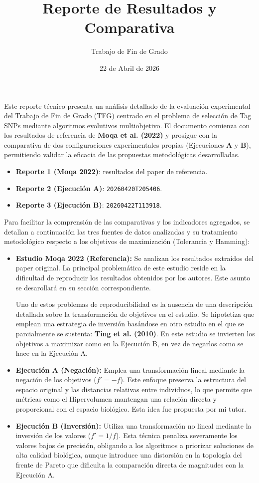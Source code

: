 \documentclass[a4paper,10pt]{article}
\title{Reporte de Resultados y Comparativa}
\author{Trabajo de Fin de Grado}
\date{22 de Abril de 2026}
\begin{document}
\maketitle

Este reporte técnico presenta un análisis detallado de la evaluación experimental del Trabajo de Fin de Grado (TFG) centrado en el problema de selección de Tag SNPs mediante algoritmos evolutivos multiobjetivo. El documento comienza con los resultados de referencia de \textbf{Moqa et al. (2022)} y prosigue con la comparativa de dos configuraciones experimentales propias (Ejecuciones \textbf{A} y \textbf{B}), permitiendo validar la eficacia de las propuestas metodológicas desarrolladas.

\begin{itemize}
    \item \textbf{Reporte 1 (Moqa 2022)}: resultados del paper de referencia.
    \item \textbf{Reporte 2 (Ejecución A)}: \texttt{20260420T205406}.
    \item \textbf{Reporte 3 (Ejecución B)}: \texttt{20260422T113918}.
\end{itemize}

Para facilitar la comprensión de las comparativas y los indicadores agregados, se detallan a continuación las tres fuentes de datos analizadas y su tratamiento metodológico respecto a los objetivos de maximización (Tolerancia y Hamming):

\begin{itemize}
    \item \textbf{Estudio Moqa 2022 (Referencia):} Se analizan los resultados extraídos del paper original. La principal problemática de este estudio reside en la dificultad de reproducir los resultados obtenidos por los autores. Este asunto se desarollará en su sección correspondiente. 
    
    Uno de estos problemas de reproducibilidad es la ausencia de una descripción detallada sobre la transformación de objetivos en el estudio. Se hipotetiza que emplean una estrategia de inversión basándose en otro estudio en el que se parcialmente se sustenta: \textbf{Ting et al. (2010)}. En este estudio se invierten los objetivos a maximizar como en la Ejecución B, en vez de negarlos como se hace en la Ejecución A.
    \item \textbf{Ejecución A (Negación):} Emplea una transformación lineal mediante la negación de los objetivos ($f' = -f$). Este enfoque preserva la estructura del espacio original y las distancias relativas entre individuos, lo que permite que métricas como el Hipervolumen mantengan una relación directa y proporcional con el espacio biológico. Esta idea fue propuesta por mi tutor.
    \item \textbf{Ejecución B (Inversión):} Utiliza una transformación no lineal mediante la inversión de los valores ($f' = 1/f$). Esta técnica penaliza severamente los valores bajos de precisión, obligando a los algoritmos a priorizar soluciones de alta calidad biológica, aunque introduce una distorsión en la topología del frente de Pareto que dificulta la comparación directa de magnitudes con la Ejecución A.
\end{itemize}
\end{document}

